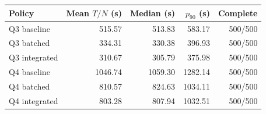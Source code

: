\begin{tabular}{lrrrr}
\toprule
Policy & Mean $T/N$ (s) & Median (s) & $p_{90}$ (s) & Complete \\
\midrule
Q3 baseline & 515.57 & 513.83 & 583.17 & 500/500 \\
Q3 batched & 334.31 & 330.38 & 396.93 & 500/500 \\
Q3 integrated & 310.67 & 305.79 & 375.98 & 500/500 \\
Q4 baseline & 1046.74 & 1059.30 & 1282.14 & 500/500 \\
Q4 batched & 810.57 & 824.63 & 1034.11 & 500/500 \\
Q4 integrated & 803.28 & 807.94 & 1032.51 & 500/500 \\
\bottomrule
\end{tabular}
